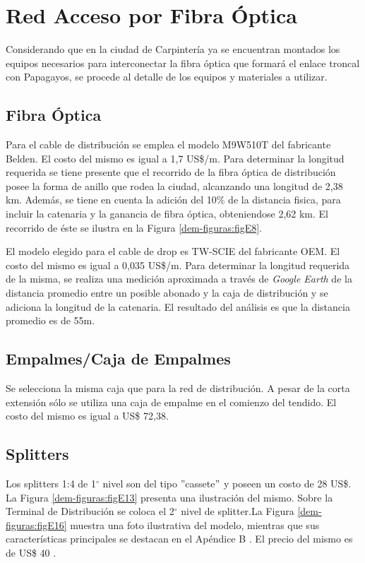 \section{Red Acceso por Fibra Óptica}
Considerando que en la ciudad de Carpintería ya se encuentran montados los equipos necesarios para interconectar la fibra óptica que formará el enlace troncal con Papagayos, se procede al detalle de los equipos y materiales a utilizar.
\subsection{Fibra Óptica}
Para el cable de distribución se emplea el modelo M9W510T del fabricante Belden. El costo del mismo es igual a 1,7 US\$/m.
Para determinar la longitud requerida se tiene presente que el recorrido de la fibra óptica de distribución posee la forma de anillo que rodea la ciudad, alcanzando una longitud de 2,38 km. Además, se tiene en cuenta la adición del 10\% de la distancia fisica, para incluir la catenaria y la ganancia de fibra óptica, obteniendose 2,62 km.
El recorrido de éste se ilustra en la Figura \ref{dem-figuras:figE8}.

El modelo elegido para el cable de drop es TW-SCIE del fabricante OEM.  El costo del mismo es igual a 0,035 US\$/m. Para determinar la longitud requerida de la misma, se realiza una medición aproximada a través de \textit{Google Earth} de la distancia promedio entre un posible abonado y la caja de distribución y se adiciona la longitud de la catenaria. El resultado del análisis es que la distancia promedio es de 55m.

\subsection{Empalmes/Caja de Empalmes}
Se selecciona la misma caja que para la red de distribución. A pesar de la corta extensión sólo se utiliza una caja de empalme en el comienzo del tendido. El costo del mismo es igual a US\$ 72,38.
\subsection{Splitters}
Los splitters 1:4 de 1$^{\circ}$ nivel son del tipo ''cassete$"$ y poseen un  costo de 28 US\$. La Figura \ref{dem-figuras:figE13} presenta una ilustración del mismo.
Sobre la Terminal de Distribución se coloca el 2$^{\circ}$ nivel de splitter.La Figura \ref{dem-figuras:figE16} muestra una foto ilustrativa del modelo, mientras que sus características principales se destacan en el Apéndice B \cite{apendice-b}. El precio del mismo es de US\$ 40 \cite{terminal-fat}.


